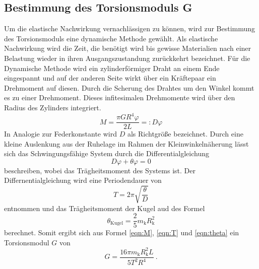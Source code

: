 \subsection{Bestimmung des Torsionsmoduls G}
Um die elastische Nachwirkung vernachlässigen zu können, wird zur Bestimmung des Torsionsmoduls eine dynamische Methode gewählt. Als elastische Nachwirkung wird die Zeit, die benötigt wird bis gewisse Materialien nach einer Belastung wieder in ihren Ausgangszustandung zurückkehrt bezeichnet.
Für die Dynamische Methode wird ein zylinderförmiger Draht an einem Ende eingespannt und auf der anderen Seite wirkt über ein Kräftepaar ein Drehmoment auf diesen. Durch die Scherung des Drahtes um den Winkel \alpha kommt es zu einer Drehmoment. Dieses infitesimalen Drehmomente wird über den Radius des Zylinders  integriert.
\begin{equation}
  M = \frac{\pi G R^4 \varphi}{2L} =: D \varphi
  \label{eqn:M}
\end{equation}
In Analogie zur Federkonstante wird $D$ als Richtgröße bezeichnet. Durch eine kleine Auslenkung aus der Ruhelage im Rahmen der Kleinwinkelnäherung lässt sich das Schwingungsfähige System durch die Differentialgleichung
\begin{equation}
  D \varphi + \theta \varphi = 0
  \label{eqn:dgl}
\end{equation}
beschreiben, wobei \theta das Trägheitsmoment des Systems ist. Der Differnentialgleichung wird eine Periodendauer von
\begin{equation}
  T = 2 \pi \sqrt{\frac{\theta}{D}}
  \label{eqn:T}
\end{equation}
entnommen und das Trägheitsmoment der Kugel aud des Formel
\begin{equation}
  \theta_\text{Kugel} = \frac{2}{5}m_\text{k}R_\text{k}^2
  \label{eqn:theta}
\end{equation}
berechnet. Somit ergibt sich aus Formel \ref{eqn:M}, \ref{eqn:T} und \ref{eqn:theta} ein Torsionsmodul $G$ von
\begin{equation}
  G = \frac{16 \pi m_\text{k} R_\text{k}^2 L}{5 T^2 R^4} \ .
  \label{eqn:G}
\end{equation}
